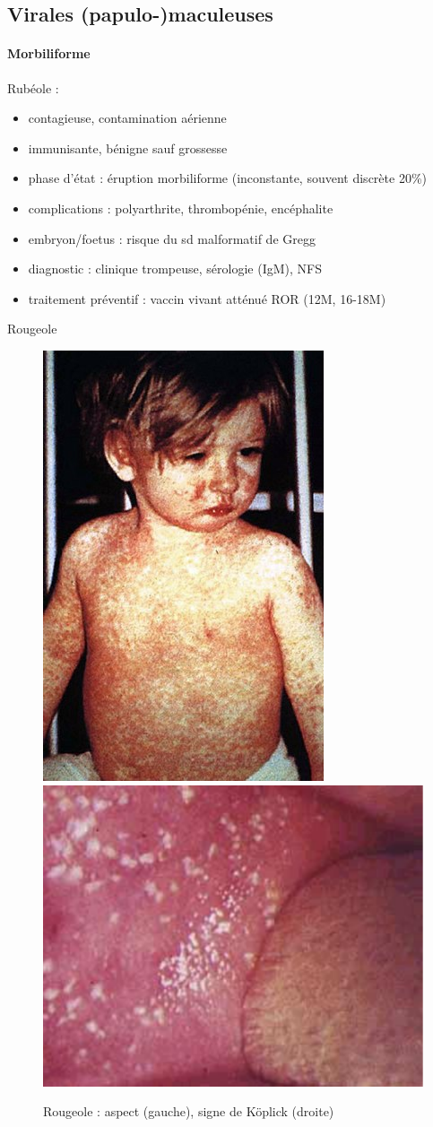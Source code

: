 \subsection{Virales (papulo-)maculeuses}

\paragraph{Morbiliforme}

Rubéole :

\begin{itemize}
\item contagieuse, contamination aérienne \item immunisante, bénigne sauf grossesse
\item phase d'état : éruption morbiliforme (inconstante, souvent discrète 20\%)
\item complications : polyarthrite, thrombopénie, encéphalite \item embryon/foetus : risque du sd malformatif de Gregg
\item diagnostic : clinique trompeuse, sérologie (IgM), NFS\\ \item traitement préventif : vaccin vivant atténué ROR (12M, 16-18M)
\end{itemize} 
Rougeole

\begin{figure}[htpb]
  \centering
  \caption{Rougeole : aspect (gauche), signe de Köplick (droite)}
  \includegraphics[width=0.3\linewidth]{160_rougeole}
  \includegraphics[width=0.5\linewidth]{160_rougeole_koplik.pdf}
\end{figure}

